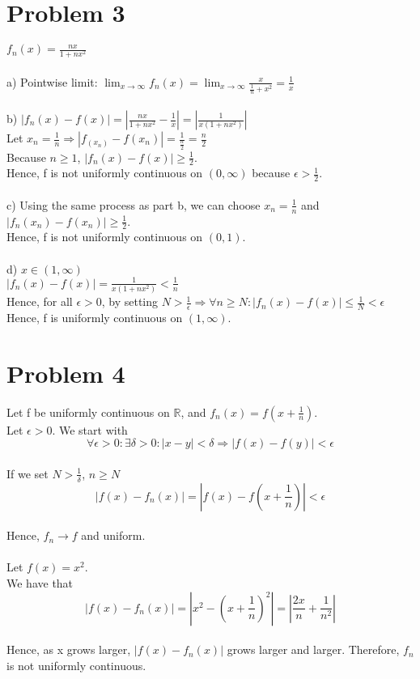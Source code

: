 \documentclass{article}
\begin{document}
\section*{Problem 3}
$f_n(x) = \frac{nx}{1+nx^2}$
\\
\\a) Pointwise limit: $\lim_{x \to \infty}f_n(x) = \lim_{x \to \infty}\frac{x}{\frac{1}{n} + x^2} = \frac{1}{x}$
\\
\\b) $|f_n(x) - f(x)| = |\frac{nx}{1+nx^2} - \frac{1}{x}| = |\frac{1}{x(1+nx^2)}|$
\\Let $x_n = \frac{1}{n} \Rightarrow |f_(x_n) - f(x_n)| = \frac{1}{\frac{n}{2}} = \frac{n}{2}$
\\Because $n \geq 1$, $|f_n(x) - f(x)| \geq \frac{1}{2}$.
\\Hence, f is not uniformly continuous on $(0, \infty)$ because $\epsilon > \frac{1}{2}$.
\\
\\c) Using the same process as part b, we can choose $x_n = \frac{1}{n}$ and $|f_n(x_n) - f(x_n)| \geq \frac{1}{2}$.
\\Hence, f is not uniformly continuous on $(0, 1)$.
\\
\\d) $x \in (1, \infty)$
\\$|f_n(x) - f(x)| = \frac{1}{x(1+nx^2)} < \frac{1}{n}$
\\Hence, for all $\epsilon > 0$, by setting $N > \frac{1}{\epsilon} \Rightarrow \forall n \geq N : |f_n(x) - f(x)| \leq \frac{1}{N} < \epsilon$
\\Hence, f is uniformly continuous on $(1, \infty)$.

\section*{Problem 4}
Let f be uniformly continuous on $\mathbb{R}$, and $f_n(x) = f(x + \frac{1}{n})$.
\\Let $\epsilon > 0$. We start with $$\forall \epsilon > 0 : \exists \delta > 0 : |x - y| < \delta \Rightarrow |f(x) - f(y)| < \epsilon$$
\\If we set $N > \frac{1}{\delta}$,  $n \geq N$
$$|f(x) - f_n(x)| = |f(x) - f(x + \frac{1}{n})| < \epsilon$$
\\Hence, $f_n \to f$ and uniform.
\\
\\Let $f(x) = x^2$.
\\We have that $$|f(x) - f_n(x)| = |x^2 - (x + \frac{1}{n})^2| = |\frac{2x}{n} + \frac{1}{n^2}|$$
\\Hence, as x grows larger, $|f(x)-f_n(x)|$ grows larger and larger. Therefore, $f_n$ is not uniformly continuous.
\end{document}
